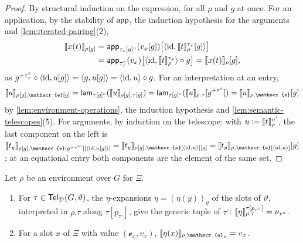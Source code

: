 \begin{proof}
    By structural induction on the expression, for all $\rho$ and $g$ at once. For an application, by the stability of $\mathsf{app}$, the induction hypothesis for the arguments and \cref{lem:iterated-pairing}(2),
    \begin{align*}
        \llbracket x(t)\rrbracket_{\rho[g]} &= \mathsf{app}_{\tau_x[g]^{\circ}}(v_x[g])\big[\langle \mathrm{id}, \llbracket t\rrbracket^{\tau_x}_\rho[g] \rangle\big]\\
        &= \mathsf{app}_{\tau_x^{\circ}}(v_x)\big[\langle \mathrm{id}, \llbracket t\rrbracket^{\tau_x}_\rho \rangle \circ g\big] = \llbracket x(t)\rrbracket_\rho[g],
    \end{align*}
    as $g^{+\tau_x^{\circ}} \circ \langle \mathrm{id}, u[g] \rangle = \langle g, u[g] \rangle = \langle \mathrm{id}, u \rangle \circ g$. For an interpretation at an entry,
    \[
        \sem{u}_{\rho[g], \mathscr{e}[g]} = \lam_{\tau[g]^{\circ}}(\sem{u}_{\rho[g].\tau[g]}) = \lam_{\tau[g]^{\circ}}(\sem{u}_{\rho.\tau}[g^{+\tau^{\circ}}]) = \sem{u}_{\rho, \mathscr{e}}[g]
    \]
    by \cref{lem:environment-operations}, the induction hypothesis and \cref{lem:semantic-telescopes}(5). For arguments, by induction on the telescope: with $u \coloneqq \llbracket t\rrbracket^{\upsilon'}_\rho$, the last component on the left is $\sem{t_y}_{\rho[g], \mathscr{e}[g^{+\upsilon'^{\circ}}][\langle \id, u[g] \rangle]} = \sem{t_y}_{\rho[g], \mathscr{e}[\langle \id, u \rangle][g]} = \sem{t_y}_{\rho, \mathscr{e}[\langle \id, u \rangle]}[g]$; at an equational entry both components are the element of the same set.
\end{proof}

\begin{lemma}[Variables]\label{lem:eta-interpretation}
    Let $\rho$ be an environment over $G$ for $\Xi$.
    \begin{enumerate}
        \item For $\tau \in \mathsf{Tel}_{\mathcal{D}}(G, \vartheta)$, the $\eta$-expansions $\eta = (\eta(y))_y$ of the slots of $\vartheta$, interpreted in $\rho.\tau$ along $\tau[p_{\tau^{\circ}}]$, give the generic tuple of $\tau^{\circ}$: $\llbracket\eta\rrbracket^{\tau[p_{\tau^{\circ}}]}_{\rho.\tau} = \nu_{\tau^{\circ}}$.
        \item For a slot $x$ of $\Xi$ with value $(\mathscr{e}_x, v_x)$, $\sem{\eta(x)}_{\rho, \mathscr{e}_x} = v_x$.
    \end{enumerate}
\end{lemma}


